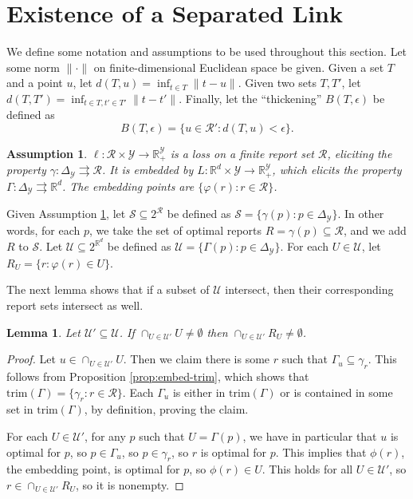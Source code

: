 \documentclass[11pt]{article}
\newcommand{\reals}{\mathbb{R}}
\newcommand{\simplex}{\Delta_\Y}
\newcommand{\R}{\mathcal{R}}
\newcommand{\U}{\mathcal{U}}
\newcommand{\Y}{\mathcal{Y}}
\newcommand{\toto}{\rightrightarrows}
\newcommand{\trim}{\mathrm{trim}}
\newtheorem{lemma}{Lemma}
\newtheorem{assumption}{Assumption}
\begin{document}
\section{Existence of a Separated Link} \label{app:sep-link-exists}

We define some notation and assumptions to be used throughout this section.
Let some norm $\|\cdot\|$ on finite-dimensional Euclidean space be given.
Given a set $T$ and a point $u$, let $d(T,u) = \inf_{t \in T} \|t-u\|$.
Given two sets $T,T'$, let $d(T,T') = \inf_{t\in T, t' \in T'} \|t-t'\|$.
Finally, let the ``thickening'' $B(T,\epsilon)$ be defined as
  \[ B(T,\epsilon) = \{u \in \R' : d(T,u) < \epsilon \} . \]

\begin{assumption} \label{assume:cal}
  $\ell: \R \times \Y \to \reals^{\Y}_+$ is a loss on a finite report set $\R$, eliciting the property $\gamma: \simplex \toto \R$.
  It is embedded by $L: \reals^d \times \Y \to \reals^{\Y}_+$, which elicits the property $\Gamma: \simplex \toto \reals^d$.
  The embedding points are $\{\varphi(r) : r \in \R\}$.
\end{assumption}

Given Assumption \ref{assume:cal}, let $\mathcal{S} \subseteq 2^{\R}$ be defined as $\mathcal{S} = \{\gamma(p) : p \in \Delta_{\Y}\}$.
In other words, for each $p$, we take the set of optimal reports $R = \gamma(p) \subseteq \R$, and we add $R$ to $\mathcal{S}$.
Let $\U \subseteq 2^{\reals^d}$ be defined as $\U = \{\Gamma(p) : p \in \Delta_{\Y}\}$.
For each $U \in \U$, let $R_U = \{r: \varphi(r) \in U\}$.

The next lemma shows that if a subset of $\U$ intersect, then their corresponding report sets intersect as well.
\begin{lemma} \label{lemma:calibrated-pos}
  Let $\U' \subseteq \U$.
  If $\cap_{U\in\U'} U \neq \emptyset$ then $\cap_{U\in\U'} R_U \neq \emptyset$.
\end{lemma}
\begin{proof}
  Let $u \in \cap_{U\in\U'} U$.
  Then we claim there is some $r$ such that $\Gamma_u \subseteq \gamma_r$.
  This follows from Proposition \ref{prop:embed-trim}, which shows that $\trim(\Gamma) = \{ \gamma_r : r \in \R\}$.
  Each $\Gamma_u$ is either in $\trim(\Gamma)$ or is contained in some set in $\trim(\Gamma)$, by definition, proving the claim.

  For each $U \in \U'$, for any $p$ such that $U = \Gamma(p)$, we have in particular that $u$ is optimal for $p$, so $p \in \Gamma_u$, so $p \in \gamma_r$, so $r$ is optimal for $p$.
  This implies that $\phi(r)$, the embedding point, is optimal for $p$, so $\phi(r) \in U$.
  This holds for all $U \in \U'$, so $r \in \cap_{U\in\U'} R_U$, so it is nonempty.
\end{proof}
\end{document}
